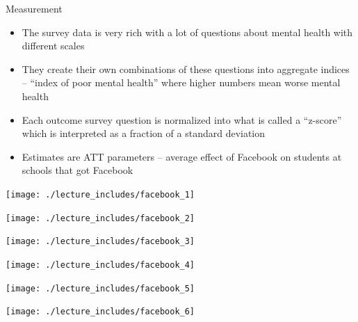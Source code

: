 \documentclass{beamer}
\begin{document}
\begin{frame}{Measurement}

\begin{itemize}
\item The survey data is very rich with a lot of questions about mental health with different scales
\item They create their own combinations of these questions into aggregate indices -- ``index of poor mental health'' where higher numbers mean worse mental health
\item Each outcome survey question is normalized into what is called a ``z-score'' which is interpreted as a fraction of a standard deviation
\item Estimates are ATT parameters -- average effect of Facebook on students at schools that got Facebook
\end{itemize}

\end{frame}


\begin{frame}
\begin{center}
\texttt{[image: ./lecture\_includes/facebook\_1]}
\end{center}
\end{frame}

\begin{frame}
\begin{center}
\texttt{[image: ./lecture\_includes/facebook\_2]}
\end{center}
\end{frame}

\begin{frame}
\begin{center}
\texttt{[image: ./lecture\_includes/facebook\_3]}
\end{center}
\end{frame}

\begin{frame}
\begin{center}
\texttt{[image: ./lecture\_includes/facebook\_4]}
\end{center}
\end{frame}

\begin{frame}
\begin{center}
\texttt{[image: ./lecture\_includes/facebook\_5]}
\end{center}
\end{frame}

\begin{frame}
\begin{center}
\texttt{[image: ./lecture\_includes/facebook\_6]}
\end{center}
\end{frame}
\end{document}
